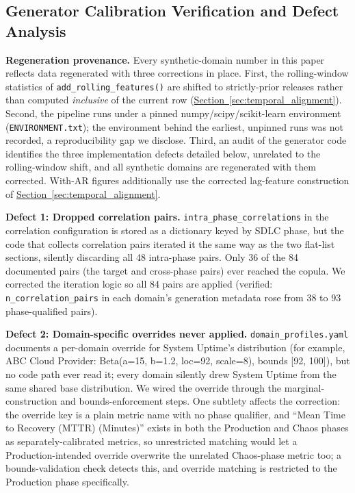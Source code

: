 \documentclass[technologies,article,submit,pdftex,moreauthors]{Definitions/mdpi}
\begin{document}
\subsection{Generator Calibration Verification and Defect Analysis}\label{sec:supp_generator_bugs}

\textbf{Regeneration provenance.} Every synthetic-domain number in this paper reflects data regenerated with three corrections in place. First, the rolling-window statistics of \texttt{add\_rolling\_features()} are shifted to strictly-prior releases rather than computed \emph{inclusive} of the current row (\hyperref[sec:temporal_alignment]{Section~\ref*{sec:temporal_alignment}}). Second, the pipeline runs under a pinned numpy/scipy/scikit-learn environment (\texttt{ENVIRONMENT.txt}); the environment behind the earliest, unpinned runs was not recorded, a reproducibility gap we disclose. Third, an audit of the generator code identifies the three implementation defects detailed below, unrelated to the rolling-window shift, and all synthetic domains are regenerated with them corrected. With-AR figures additionally use the corrected lag-feature construction of \hyperref[sec:temporal_alignment]{Section~\ref*{sec:temporal_alignment}}.

\textbf{Defect 1: Dropped correlation pairs.} \texttt{intra\_phase\_correlations} in the correlation configuration is stored as a dictionary keyed by SDLC phase, but the code that collects correlation pairs iterated it the same way as the two flat-list sections, silently discarding all 48 intra-phase pairs. Only 36 of the 84 documented pairs (the target and cross-phase pairs) ever reached the copula. We corrected the iteration logic so all 84 pairs are applied (verified: \texttt{n\_correlation\_pairs} in each domain's generation metadata rose from 38 to 93 phase-qualified pairs).

\textbf{Defect 2: Domain-specific overrides never applied.} \texttt{domain\_profiles.yaml} documents a per-domain override for System Uptime's distribution (for example, ABC Cloud Provider: Beta(a=15, b=1.2, loc=92, scale=8), bounds {[}92, 100{]}), but no code path ever read it; every domain silently drew System Uptime from the same shared base distribution. We wired the override through the marginal-construction and bounds-enforcement steps. One subtlety affects the correction: the override key is a plain metric name with no phase qualifier, and ``Mean Time to Recovery (MTTR) (Minutes)'' exists in both the Production and Chaos phases as separately-calibrated metrics, so unrestricted matching would let a Production-intended override overwrite the unrelated Chaos-phase metric too; a bounds-validation check detects this, and override matching is restricted to the Production phase specifically.
\end{document}

